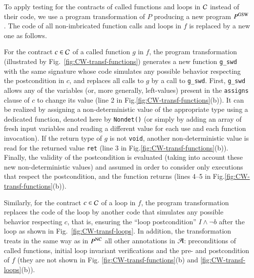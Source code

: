 To apply testing for  the contracts of called functions and loops in ${\mathcal{C}}$
instead of their code,
we use a program transformation of $P$ producing a new program $P^{\mathrm{GSW}}$.
The code of all non-imbricated function calls and loops in $f$
is replaced by a new one as follows.

For the contract $c\in{\ensuremath\mathcal{C}}$ of a called function $g$ in $f$, 
the program transformation  (illustrated by Fig.~\ref{fig:CW-transf-functions})
generates a new function \lstinline{g_swd} with the same signature 
whose code simulates any possible behavior respecting the postcondition in $c$, 
and replaces all calls to $g$ by  a call to \lstinline{g_swd}.
First, \lstinline{g_swd} allows any of the variables
(or, more generally, left-values) present in
the \lstinline{assigns} clause of $c$ to change its value 
(line 2 in Fig.\ref{fig:CW-transf-functions}(b)).
It can be realized by assigning a non-deterministic 
value of the appropriate type
using a dedicated function, denoted here by \lstinline{Nondet()}
(or simply by adding an array of fresh input variables and reading
a different value for each use and each function invocation).
If the return type of $g$ is not \lstinline{void},
another non-deterministic value is read for the returned value
\lstinline{ret} (line 3 in Fig.\ref{fig:CW-transf-functions}(b)).
Finally, the validity of the postcondition is evaluated (taking into
account these new non-deterministic values) 
and assumed
in order to consider only executions that respect 
the postcondition, and
the function returns (lines 4--5 in Fig.\ref{fig:CW-transf-functions}(b)).

Similarly, for the contract $c\in{\ensuremath\mathcal{C}}$ of a loop in $f$, 
the program transformation  
replaces the code of the loop by 
another code that simulates any possible behavior respecting $c$, that is, 
ensuring the ``loop postcondition'' $I\wedge \neg b$ after the loop as shown in Fig.~\ref{fig:CW-transf-loops}.
In addition, the transformation treats in the same way as in $P^{\mathrm{NC}}$
all other annotations in ${\mathcal{A}}$:
preconditions of called functions, initial loop invariant verifications 
and the  pre- and postcondition of $f$
(they are not shown 
in Fig. \ref{fig:CW-transf-functions}(b) and \ref{fig:CW-transf-loops}(b)).

